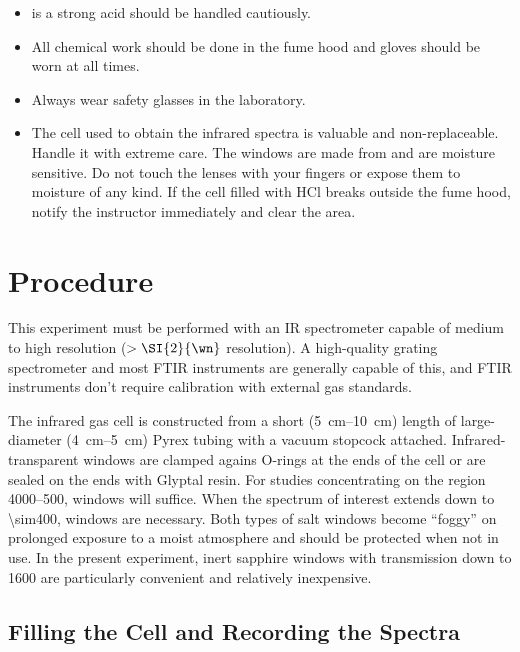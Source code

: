 \begin{itemize}
	\item {} is a strong acid should be handled cautiously. 
	\item All chemical work should be done in the fume hood and gloves should be worn at all times. 
	\item Always wear safety glasses in the laboratory.
	\item The cell used to obtain the infrared spectra is valuable and non-replaceable. 
	Handle it with extreme care. 
	The windows are made from  and are moisture sensitive. 
	Do not touch the lenses with your fingers or expose them to moisture of any kind. 
	If the cell filled with HCl breaks outside the fume hood, notify the instructor immediately and clear the area. 
\end{itemize}


\section{Procedure} %
\label{sec:procedure}

This experiment must be performed with an IR spectrometer capable of medium to high resolution (\( > \SI{2}{\wn} \) resolution). 
A high-quality grating spectrometer and most FTIR instruments are generally capable of this, and FTIR instruments don't require calibration with external gas standards. 

The infrared gas cell is constructed from a short (\SIrange{5}{10}{\cm}) length of large-diameter (\SIrange{4}{5}{\cm}) Pyrex tubing with a vacuum stopcock attached. 
Infrared-transparent windows are clamped agains O-rings at the ends of the cell or are sealed on the ends with Glyptal resin. 
For studies concentrating on the region \SIrange{4000}{500}{\wn},  windows will suffice. 
When the spectrum of interest extends down to \SI{\sim400}{\wn},  windows are necessary. 
Both types of salt windows become ``foggy'' on prolonged exposure to a moist atmosphere and should be protected when not in use. 
In the present experiment, inert sapphire windows with transmission down to \SI{1600}{\wn} are particularly convenient and relatively inexpensive. 

\subsection{Filling the Cell and Recording the Spectra} %
\label{sub:filling_the_cell}

